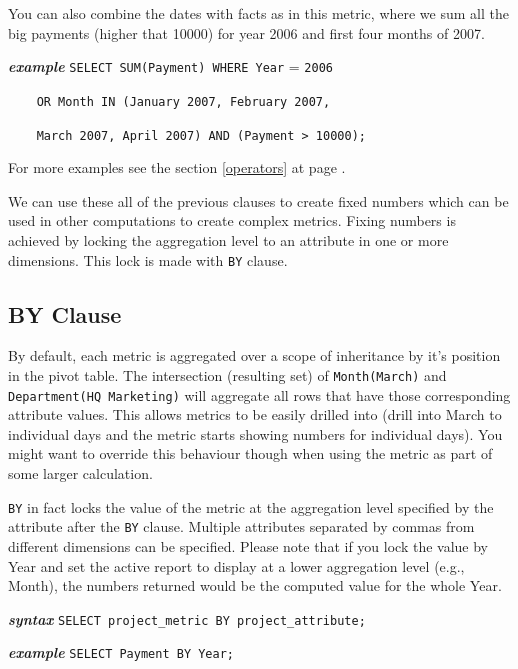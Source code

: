 \documentclass[a4paper, 12pt, titlepage, fleqn]{article}
\begin{document}
You can also combine the dates with facts as in this metric, where we sum all the big payments (higher that 10000) for year 2006 and first four months of 2007.

\textbf{\emph{example}}  \hspace{.9cm}\verb=SELECT SUM(Payment) WHERE Year= = \verb=2006 =

\hspace{2.2cm}\verb=	OR Month IN (January 2007, February 2007,= 

\hspace{2.2cm}\verb=	March 2007, April 2007) AND (Payment > 10000);=

For more examples see the section \ref{operators} at page \pageref{operators}.

We can use these all of the previous clauses to create fixed numbers which can be used in other computations to create complex metrics. Fixing numbers is achieved by locking the aggregation level to an attribute in one or more dimensions. This lock is made with \verb=BY= clause.

\subsection{BY Clause}
By default, each metric is aggregated over a scope of inheritance by it's position in the pivot table. The intersection (resulting set) of \verb=Month(March)= and \verb=Department(HQ Marketing)= will aggregate all rows that have those corresponding attribute values. This allows metrics to be easily drilled into (drill into March to individual days and the metric starts showing numbers for individual days). You might want to override this behaviour though when using the metric as part of some larger calculation.

\verb=BY= in fact locks the value of the metric at the aggregation level specified by the attribute after the \verb=BY= clause. Multiple attributes separated by commas from different dimensions can be specified. Please note that if you lock the value by Year and set the active report to display at a lower aggregation level (e.g., Month), the numbers returned would be the computed value for the whole Year.

\textbf{\emph{syntax}}  \hspace{.9cm}\verb=SELECT project_metric BY project_attribute;=

\textbf{\emph{example}}  \hspace{.9cm}\verb=SELECT Payment BY Year;=
\end{document}
